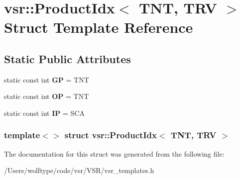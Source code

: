 \hypertarget{structvsr_1_1_product_idx_3_01_t_n_t_00_01_t_r_v_01_4}{\section{vsr\-:\-:Product\-Idx$<$ T\-N\-T, T\-R\-V $>$ Struct Template Reference}
\label{structvsr_1_1_product_idx_3_01_t_n_t_00_01_t_r_v_01_4}
}
\subsection*{Static Public Attributes}
\begin{DoxyCompactItemize}
\item 
\hypertarget{structvsr_1_1_product_idx_3_01_t_n_t_00_01_t_r_v_01_4_a394133f1187508153bb838acebad0147}{static const int {\bfseries G\-P} = T\-N\-T}\label{structvsr_1_1_product_idx_3_01_t_n_t_00_01_t_r_v_01_4_a394133f1187508153bb838acebad0147}

\item 
\hypertarget{structvsr_1_1_product_idx_3_01_t_n_t_00_01_t_r_v_01_4_a13545912914290b890a83d124da33cc5}{static const int {\bfseries O\-P} = T\-N\-T}\label{structvsr_1_1_product_idx_3_01_t_n_t_00_01_t_r_v_01_4_a13545912914290b890a83d124da33cc5}

\item 
\hypertarget{structvsr_1_1_product_idx_3_01_t_n_t_00_01_t_r_v_01_4_ab71f018d473a79afd9c4cda6f5c5415e}{static const int {\bfseries I\-P} = S\-C\-A}\label{structvsr_1_1_product_idx_3_01_t_n_t_00_01_t_r_v_01_4_ab71f018d473a79afd9c4cda6f5c5415e}

\end{DoxyCompactItemize}
\subsubsection*{template$<$$>$ struct vsr\-::\-Product\-Idx$<$ T\-N\-T, T\-R\-V $>$}



The documentation for this struct was generated from the following file\-:\begin{DoxyCompactItemize}
\item 
/\-Users/wolftype/code/vsr/\-V\-S\-R/vsr\-\_\-templates.\-h\end{DoxyCompactItemize}
